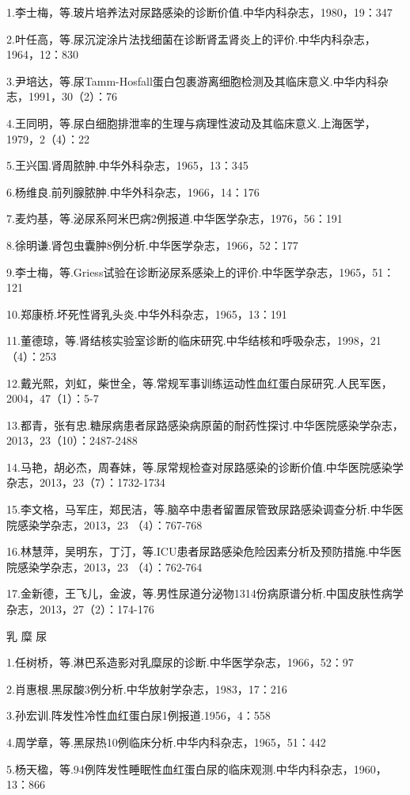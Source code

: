 1.李士梅，等.玻片培养法对尿路感染的诊断价值.中华内科杂志，1980，19：347

2.叶任高，等.尿沉淀涂片法找细菌在诊断肾盂肾炎上的评价.中华内科杂志，1964，12：830

3.尹培达，等.尿Tamm-Hosfall蛋白包裹游离细胞检测及其临床意义.中华内科杂志，1991，30（2）：76

4.王同明，等.尿白细胞排泄率的生理与病理性波动及其临床意义.上海医学，1979，2（4）：22

5.王兴国.肾周脓肿.中华外科杂志，1965，13：345

6.杨维良.前列腺脓肿.中华外科杂志，1966，14：176

7.麦灼基，等.泌尿系阿米巴病2例报道.中华医学杂志，1976，56：191

8.徐明谦.肾包虫囊肿8例分析.中华医学杂志，1966，52：177

9.李士梅，等.Griess试验在诊断泌尿系感染上的评价.中华医学杂志，1965，51：121

10.郑康桥.坏死性肾乳头炎.中华外科杂志，1965，13：191

11.董德琼，等.肾结核实验室诊断的临床研究.中华结核和呼吸杂志，1998，21（4）：253

12.戴光熙，刘虹，柴世全，等.常规军事训练运动性血红蛋白尿研究.人民军医，2004，47（1）：5-7

13.都青，张有忠.糖尿病患者尿路感染病原菌的耐药性探讨.中华医院感染学杂志，2013，23（10）：2487-2488

14.马艳，胡必杰，周春妹，等.尿常规检查对尿路感染的诊断价值.中华医院感染学杂志，2013，23（7）：1732-1734

15.李文格，马军庄，郑民洁，等.脑卒中患者留置尿管致尿路感染调查分析.中华医院感染学杂志，2013，23
（4）：767-768

16.林慧萍，吴明东，丁汀，等.ICU患者尿路感染危险因素分析及预防措施.中华医院感染学杂志，2013，23
（4）：762-764

17.金新德，王飞儿，金波，等.男性尿道分泌物1314份病原谱分析.中国皮肤性病学杂志，2013，27（2）：174-176

乳 糜 尿

1.任树桥，等.淋巴系造影对乳糜尿的诊断.中华医学杂志，1966，52：97

2.肖惠根.黑尿酸3例分析.中华放射学杂志，1983，17：216

3.孙宏训.阵发性冷性血红蛋白尿1例报道.1956，4：558

4.周学章，等.黑尿热10例临床分析.中华内科杂志，1965，51：442

5.杨天楹，等.94例阵发性睡眠性血红蛋白尿的临床观测.中华内科杂志，1960，13：866

